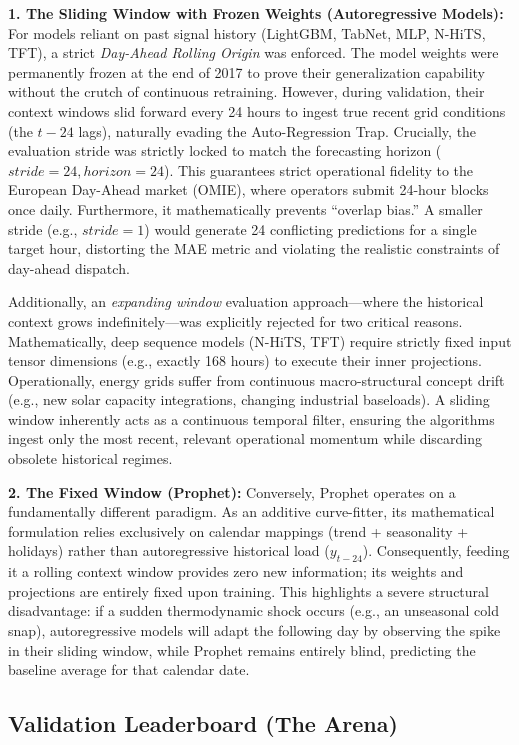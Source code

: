 \documentclass{article}
\begin{document}
\textbf{1. The Sliding Window with Frozen Weights (Autoregressive Models):} For models reliant on past signal history (LightGBM, TabNet, MLP, N-HiTS, TFT), a strict \textit{Day-Ahead Rolling Origin} was enforced. The model weights were permanently frozen at the end of 2017 to prove their generalization capability without the crutch of continuous retraining. However, during validation, their context windows slid forward every 24 hours to ingest true recent grid conditions (the $t-24$ lags), naturally evading the Auto-Regression Trap. Crucially, the evaluation stride was strictly locked to match the forecasting horizon ($stride = 24, horizon = 24$). This guarantees strict operational fidelity to the European Day-Ahead market (OMIE), where operators submit 24-hour blocks once daily. Furthermore, it mathematically prevents ``overlap bias.'' A smaller stride (e.g., $stride=1$) would generate 24 conflicting predictions for a single target hour, distorting the MAE metric and violating the realistic constraints of day-ahead dispatch. 

Additionally, an \textit{expanding window} evaluation approach—where the historical context grows indefinitely—was explicitly rejected for two critical reasons. Mathematically, deep sequence models (N-HiTS, TFT) require strictly fixed input tensor dimensions (e.g., exactly 168 hours) to execute their inner projections. Operationally, energy grids suffer from continuous macro-structural concept drift (e.g., new solar capacity integrations, changing industrial baseloads). A sliding window inherently acts as a continuous temporal filter, ensuring the algorithms ingest only the most recent, relevant operational momentum while discarding obsolete historical regimes.

\textbf{2. The Fixed Window (Prophet):} Conversely, Prophet operates on a fundamentally different paradigm. As an additive curve-fitter, its mathematical formulation relies exclusively on calendar mappings (trend + seasonality + holidays) rather than autoregressive historical load ($y_{t-24}$). Consequently, feeding it a rolling context window provides zero new information; its weights and projections are entirely fixed upon training. This highlights a severe structural disadvantage: if a sudden thermodynamic shock occurs (e.g., an unseasonal cold snap), autoregressive models will adapt the following day by observing the spike in their sliding window, while Prophet remains entirely blind, predicting the baseline average for that calendar date.

\subsection*{Validation Leaderboard (The Arena)}
\end{document}
